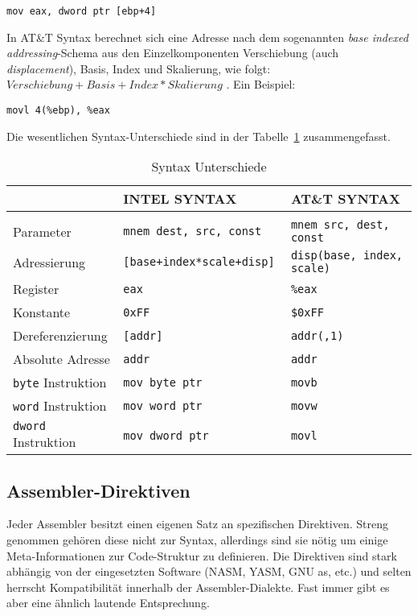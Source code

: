 \hspace{5mm} 
\texttt{mov eax, dword ptr [ebp+4]}

In AT\&T Syntax berechnet sich eine Adresse nach dem sogenannten \emph{base
indexed addressing}-Schema aus den Einzelkomponenten Verschiebung (auch
\emph{displacement}), Basis, Index und Skalierung, wie folgt: $Verschiebung + Basis +
Index*Skalierung$ . Ein Beispiel:

\hspace{5mm} 
\texttt{movl 4(\%ebp), \%eax}

Die wesentlichen Syntax-Unterschiede sind in der Tabelle~\ref{tab:syntaxdiffs}
zusammengefasst.


\begin{table}[h]	%
\begin{tabular}{lll}
\\	                          & INTEL SYNTAX                  & AT\&T SYNTAX
\\\hline
\\	Parameter 								& \tt mnem dest, src, const  	  & \tt mnem src, dest, const
\\  Adressierung  				  	&	\tt [base+index*scale+disp]   & \tt disp(base, index, scale)
\\	Register      						& \tt eax              					& \tt \%eax
\\	Konstante     						& \tt 0xFF             					& \tt \$0xFF
\\	Dereferenzierung   				& \tt [addr]           					& \tt addr(,1)
\\	Absolute Adresse 			 	  & \tt addr             					& \tt *addr
\\	{\tt byte} Instruktion    & \tt mov byte ptr     					& \tt movb
\\	{\tt word} Instruktion    & \tt mov word ptr     					& \tt movw
\\  {\tt dword} Instruktion   & \tt mov dword ptr    					& \tt movl
\end{tabular}
\caption{Syntax Unterschiede} \label{tab:syntaxdiffs}
\end{table}

\subsection{Assembler-Direktiven}
Jeder Assembler besitzt einen eigenen Satz an spezifischen Direktiven. Streng
genommen gehören diese nicht zur Syntax, allerdings sind sie nötig um einige
Meta-Informationen zur Code-Struktur zu definieren. Die Direktiven sind stark
abhängig von der eingesetzten Software (NASM, YASM, GNU as, etc.) und selten
herrscht Kompatibilität innerhalb der Assembler-Dialekte. Fast immer gibt es aber eine
ähnlich lautende Entsprechung. 

